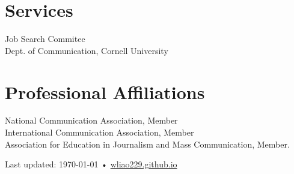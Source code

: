 \documentclass[11pt, letterpaper]{article} %
\newcommand{\years}[1]{\leavevmode\marginnote{\scriptsize #1}} %
\begin{document}
\section*{Services}

Job Search Commitee \years{2016} \\
\textsf{Dept. of Communication, Cornell University}


\section*{Professional Affiliations}

National Communication Association, Member\\
International Communication Association, Member\\
Association for Education in Journalism and Mass Communication, Member.

\vfill{} %


\begin{center}
{\scriptsize Last updated: \today\- •\- \href{https://wliao229.github.io}{wliao229.github.io}} %
\end{center}

\end{document}
